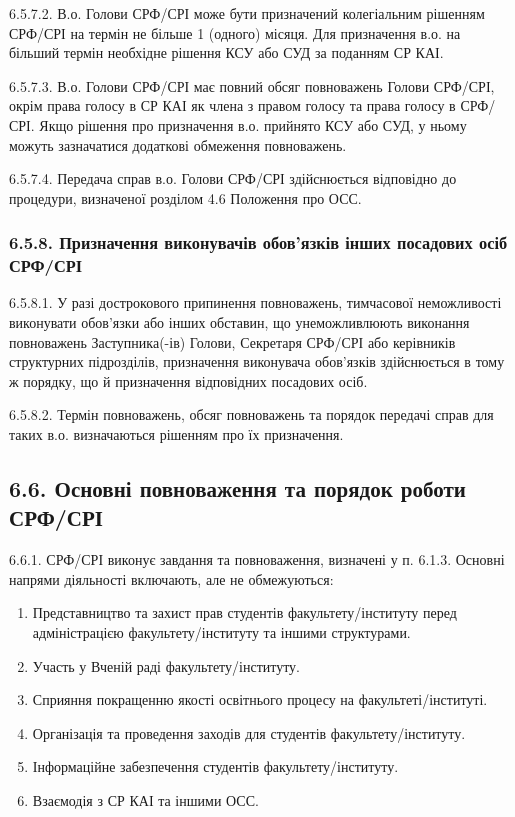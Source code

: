         6.5.7.2. В.о. Голови СРФ/СРІ може бути призначений колегіальним рішенням СРФ/СРІ на термін не більше 1 (одного) місяця. Для призначення в.о. на більший термін необхідне рішення КСУ або СУД за поданням СР КАІ.
        
        6.5.7.3. В.о. Голови СРФ/СРІ має повний обсяг повноважень Голови СРФ/СРІ, окрім права голосу в СР КАІ як члена з правом голосу та права голосу в СРФ/СРІ. Якщо рішення про призначення в.о. прийнято КСУ або СУД, у ньому можуть зазначатися додаткові обмеження повноважень.
        
        6.5.7.4. Передача справ в.о. Голови СРФ/СРІ здійснюється відповідно до процедури, визначеної розділом 4.6 Положення про ОСС.
        
    \subsubsection*{6.5.8. Призначення виконувачів обов'язків інших посадових осіб СРФ/СРІ}
        6.5.8.1. У разі дострокового припинення повноважень, тимчасової неможливості виконувати обов'язки або інших обставин, що унеможливлюють виконання повноважень Заступника(-ів) Голови, Секретаря СРФ/СРІ або керівників структурних підрозділів, призначення виконувача обов'язків здійснюється в тому ж порядку, що й призначення відповідних посадових осіб.
        
        6.5.8.2. Термін повноважень, обсяг повноважень та порядок передачі справ для таких в.о. визначаються рішенням про їх призначення.

\subsection*{6.6. Основні повноваження та порядок роботи СРФ/СРІ}
    6.6.1. СРФ/СРІ виконує завдання та повноваження, визначені у п. 6.1.3. Основні напрями діяльності включають, але не обмежуються:

        \begin{enumerate}[label=\alph*)]
            \item Представництво та захист прав студентів факультету/інституту перед адміністрацією факультету/інституту та іншими структурами.
            \item Участь у Вченій раді факультету/інституту.
            \item Сприяння покращенню якості освітнього процесу на факультеті/інституті.
            \item Організація та проведення заходів для студентів факультету/інституту.
            \item Інформаційне забезпечення студентів факультету/інституту.
            \item Взаємодія з СР КАІ та іншими ОСС.
        \end{enumerate}
        
